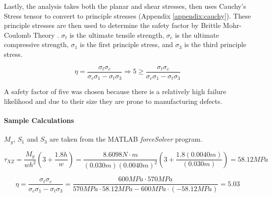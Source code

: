 \documentclass[../main.tex]{subfiles}
\begin{document}
Lastly, the analysis takes both the planar and shear stresses, then uses Cauchy's Stress tensor to convert to principle stresses (Appendix \ref{appendix:cauchy}). These principle stresses are then used to determine the safety factor by Brittle Mohr-Coulomb Theory \cite[227]{shigley}. $\sigma_t$ is the ultimate tensile strength, $\sigma_c$ is the ultimate compressive strength, $\sigma_1$ is the first principle stress, and $\sigma_3$ is the third principle stress.

\begin{equation}
\eta = \frac{\sigma_t\sigma_c} {\sigma_c\sigma_1 -\sigma_t\sigma_3} \Rightarrow 5 \geq \frac{\sigma_t\sigma_c} {\sigma_c\sigma_1 -\sigma_t\sigma_3}
\end{equation}

A safety factor of five was chosen because there is a relatively high failure likelihood and due to their size they are prone to manufacturing defects.

\paragraph*{Sample Calculations}
$M_y$, $S_1$ and $S_3$ are taken from the MATLAB \textit{forceSolver} program.

$$\tau_{XZ} = \dfrac{M_{y}}{wh^2}\left(3+\frac{1.8h}{w}\right)= \dfrac{8.6098N\cdot{}m}{(0.030m)(0.0040m)^2}\left(3+\frac{1.8(0.0040m)}{(0.030m)}\right)=58.12MPa$$

$$\eta = \frac{\sigma_t\sigma_c} {\sigma_c\sigma_1 -\sigma_t\sigma_3}=\frac{600MPa\cdot{}570MPa} {570MPa\cdot{}58.12MPa - 600MPa\cdot{}(-58.12MPa)}=5.03$$
\end{document}
